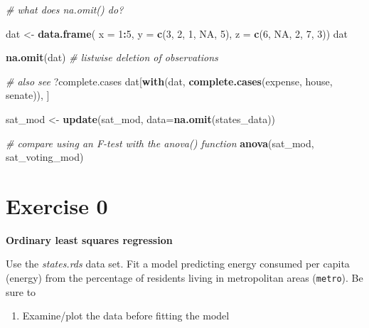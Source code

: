 \documentclass[]{book}
\newenvironment{Shaded}{\begin{snugshade}}{\end{snugshade}}
\newcommand{\CommentTok}[1]{\textcolor[rgb]{0.56,0.35,0.01}{\textit{#1}}}
\newcommand{\DataTypeTok}[1]{\textcolor[rgb]{0.13,0.29,0.53}{#1}}
\newcommand{\DecValTok}[1]{\textcolor[rgb]{0.00,0.00,0.81}{#1}}
\newcommand{\KeywordTok}[1]{\textcolor[rgb]{0.13,0.29,0.53}{\textbf{#1}}}
\newcommand{\NormalTok}[1]{#1}
\newcommand{\OperatorTok}[1]{\textcolor[rgb]{0.81,0.36,0.00}{\textbf{#1}}}
\newcommand{\OtherTok}[1]{\textcolor[rgb]{0.56,0.35,0.01}{#1}}
\newcommand{\StringTok}[1]{\textcolor[rgb]{0.31,0.60,0.02}{#1}}
\providecommand{\tightlist}{%
  \setlength{\itemsep}{0pt}\setlength{\parskip}{0pt}}
\begin{document}
\begin{Shaded}
\begin{Highlighting}[]
\CommentTok{# what does na.omit() do?}

\NormalTok{dat <-}\StringTok{ }\KeywordTok{data.frame}\NormalTok{(}
  \DataTypeTok{x =} \DecValTok{1}\OperatorTok{:}\DecValTok{5}\NormalTok{, }
  \DataTypeTok{y =} \KeywordTok{c}\NormalTok{(}\DecValTok{3}\NormalTok{, }\DecValTok{2}\NormalTok{, }\DecValTok{1}\NormalTok{, }\OtherTok{NA}\NormalTok{, }\DecValTok{5}\NormalTok{), }
  \DataTypeTok{z =} \KeywordTok{c}\NormalTok{(}\DecValTok{6}\NormalTok{, }\OtherTok{NA}\NormalTok{, }\DecValTok{2}\NormalTok{, }\DecValTok{7}\NormalTok{, }\DecValTok{3}\NormalTok{))}
\NormalTok{dat}

\KeywordTok{na.omit}\NormalTok{(dat) }\CommentTok{# listwise deletion of observations}

\CommentTok{# also see}
\NormalTok{?complete.cases}
\NormalTok{dat[}\KeywordTok{with}\NormalTok{(dat, }\KeywordTok{complete.cases}\NormalTok{(expense, house, senate)), ]}
\end{Highlighting}
\end{Shaded}

\begin{Shaded}
\begin{Highlighting}[]
\NormalTok{  sat_mod <-}\StringTok{ }\KeywordTok{update}\NormalTok{(sat_mod, }\DataTypeTok{data=}\KeywordTok{na.omit}\NormalTok{(states_data))}

  \CommentTok{# compare using an F-test with the anova() function}
  \KeywordTok{anova}\NormalTok{(sat_mod, sat_voting_mod)}
\end{Highlighting}
\end{Shaded}

\hypertarget{exercise-0-1}{%
\section{Exercise 0}\label{exercise-0-1}}

\textbf{Ordinary least squares regression}

Use the \emph{states.rds} data set. Fit a model predicting energy consumed per capita (energy) from the percentage of residents living in metropolitan areas (\texttt{metro}). Be sure to

\begin{enumerate}
\def\labelenumi{\arabic{enumi}.}
\tightlist
\item
  Examine/plot the data before fitting the model
\end{enumerate}
\end{document}
